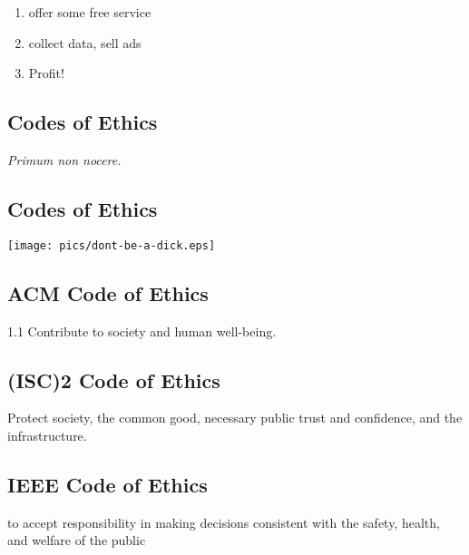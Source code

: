 \documentclass[xga]{xdvislides}
\begin{document}
\vspace*{\fill}
\begin{enumerate}
	\item offer some free service
	\item collect data, sell ads
	\item Profit!
\end{enumerate}
\vspace*{\fill}

\subsection{Codes of Ethics}
\Huge
\vspace*{\fill}
\begin{center}
	{\em Primum non nocere.}
\end{center}
\vspace*{\fill}
\Normalsize

\subsection{Codes of Ethics}
\vspace*{\fill}
\begin{center}
	\texttt{[image: pics/dont-be-a-dick.eps]}
\end{center}
\vspace*{\fill}

\subsection{ACM Code of Ethics}
\Huge
\vspace*{\fill}
\begin{center}
1.1 Contribute to society and human well-being.
\end{center}
\vspace*{\fill}
\Normalsize

\subsection{(ISC)2 Code of Ethics}
\Huge
\vspace*{\fill}
\begin{center}
Protect society, the common good, necessary public
trust and confidence, and the infrastructure.
\end{center}
\vspace*{\fill}
\Normalsize

\subsection{IEEE Code of Ethics}
\Huge
\vspace*{\fill}
\begin{center}
to accept responsibility in making decisions
consistent with the safety, health, and welfare of the
public
\end{center}
\vspace*{\fill}
\Normalsize
\end{document}
